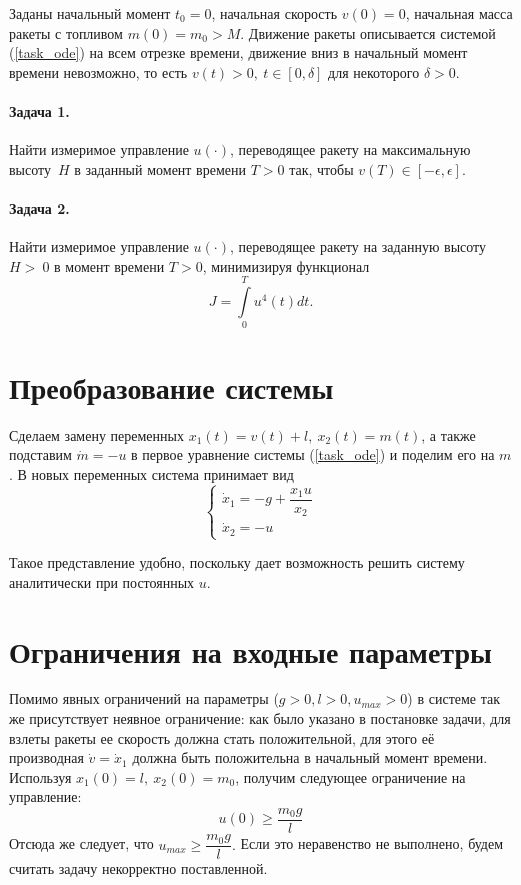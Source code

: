 \documentclass[16pt]{article}
\newcommand\A{(\cdot)}
\newcommand\Int[2]{\int\limits_{#1}^{#2}}
\begin{document}
Заданы начальный момент $t_0 = 0$, начальная скорость $v(0) = 0$, начальная масса ракеты с топливом $m(0) = 
m_0 > M$. Движение ракеты описывается системой (\ref{task_ode}) на всем отрезке времени, движение вниз в 
начальный момент времени невозможно, то есть $v(t) > 0, \  t \in [0, \delta]$ для некоторого $\delta > 0$.
\paragraph{Задача 1.} 
Найти измеримое управление $u\A$, переводящее ракету на максимальную высоту~$H$ в заданный момент времени $T > 0$
 так, чтобы $v(T) \in [-\epsilon,\epsilon]$.

\paragraph{Задача 2.} Найти измеримое управление $u\A$, переводящее ракету на заданную высоту $H >~0$ в момент
 времени $T > 0$, минимизируя функционал
 $$ J = \Int{0}{T} u^4(t)dt.$$

\section{Преобразование системы}
Сделаем замену переменных $x_1(t) = v(t) + l, \ x_2(t) = m(t)$, а также подставим $\dot{m} = -u$
в первое уравнение системы (\ref{task_ode}) и поделим его на $m$.
В новых переменных система принимает вид
\begin{equation}
\begin{cases} \label{rocket_ode}
\dot{x}_1 = -g + \dfrac{x_1u}{x_2} \\
\dot{x}_2 = -u
\end{cases}
\end{equation}

Такое представление удобно, поскольку дает возможность решить систему аналитически при постоянных $u$.
\section{Ограничения на входные параметры}
Помимо явных ограничений на параметры ($g > 0, l > 0, u_{max} > 0$) в системе так же присутствует неявное
ограничение: как было указано в постановке задачи, для взлеты ракеты ее скорость должна стать положительной, 
для этого её производная $\dot{v} = \dot{x}_1$ должна быть положительна в начальный момент времени. 
Используя $x_1(0) = l, \ x_2(0) = m_0$, получим следующее ограничение на управление:
\begin{equation} \label{u0_restr}
u(0) \geqslant \dfrac{m_0g}{l}
\end{equation}
Отсюда же следует, что
$ u_{max} \geqslant \dfrac{m_0g}{l}.$ Если это неравенство не выполнено, будем считать задачу некорректно поставленной.
\end{document}
